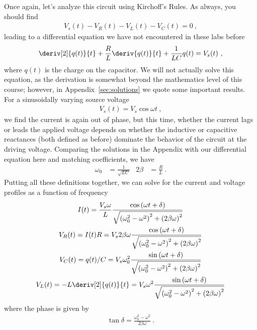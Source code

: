 \documentclass[12pt]{article}
\begin{document}
Once again, let's analyze this circuit using Kirchoff's Rules.  As
always, you should find
\begin{gather*}
  V_s(t) - V_R(t) - V_L(t) - V_C(t) = 0\ ,
\end{gather*}
leading to a differential equation we have not encountered in these
labs before
\begin{gather*}
  \deriv[2]{q(t)}{t} + \frac{R}{L} \deriv{q(t)}{t} + \frac{1}{LC} q(t)
  = V_s(t)\ ,
\end{gather*}
where $q(t)$ is the charge on the capacitor.  We will not actually
solve this equation, as the derivation is somewhat beyond the
mathematics level of this course; however, in
Appendix~\ref{sec:solutions} we quote some important results.  For a
sinusoidally varying source voltage
\begin{gather*}
  V_s(t) = V_s \cos\omega t\ ,
\end{gather*}
we find the current is again out of phase, but this time, whether the
current lags or leads the applied voltage depends on whether the
inductive or capacitive reactances (both defined as before) dominate
the behavior of the circuit at the driving voltage.  Comparing the
solutions in the Appendix with our differential equation here
and matching coefficients, we have
\begin{align*}
  \omega_0 &= \frac{1}{\sqrt{LC}} & 2\beta &= \frac{R}{L}\ .
\end{align*}
Putting all these definitions together, we can solve for the current
and voltage profiles as a function of frequency
\begin{gather*}
  I(t) = \frac{V_s \omega}{L} 
  \frac{\cos\left(\omega t + \delta\right)}
  {\sqrt{\left(\omega_0^2-\omega^2\right)^2 +
      \left(2\beta\omega\right)^2}}\\ 
  V_R(t) = I(t) R = V_s 2\beta\omega 
  \frac{\cos\left(\omega t + \delta\right)}
  {\sqrt{\left(\omega_0^2-\omega^2\right)^2 +
      \left(2\beta\omega\right)^2}}\\
  V_C(t) = q(t)/C = 
  V_s \omega_0^2 \frac{\sin\left(\omega t + \delta\right)}
  {\sqrt{\left(\omega_0^2-\omega^2\right)^2 +
      \left(2\beta\omega\right)^2}}\\ 
  V_L(t) = -L\deriv[2]{q(t)}{t} = 
  V_s \omega^2 \frac{\sin\left(\omega t + \delta\right)}
  {\sqrt{\left(\omega_0^2-\omega^2\right)^2 +
      \left(2\beta\omega\right)^2}}\\ 
\end{gather*}
where the phase is given by 
\begin{gather*}
  \tan \delta = \frac{\omega_0^2-\omega^2}{2\beta\omega}\ .
\end{gather*}
\end{document}

